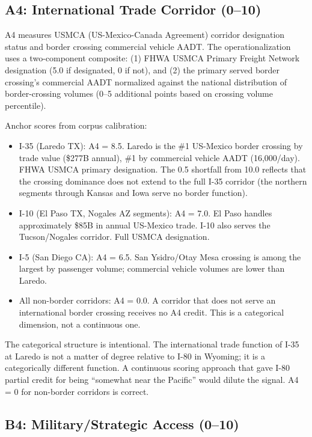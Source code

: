 \subsection{A4: International Trade Corridor (0--10)}

A4 measures USMCA (US-Mexico-Canada Agreement) corridor designation status and border crossing commercial vehicle AADT. The operationalization uses a two-component composite: (1) FHWA USMCA Primary Freight Network designation (5.0 if designated, 0 if not), and (2) the primary served border crossing's commercial AADT normalized against the national distribution of border-crossing volumes (0--5 additional points based on crossing volume percentile).

Anchor scores from corpus calibration:

\begin{itemize}
  \item I-35 (Laredo TX): A4 = 8.5. Laredo is the \#1 US-Mexico border crossing by trade value (\$277B annual), \#1 by commercial vehicle AADT (16,000/day). FHWA USMCA primary designation. The 0.5 shortfall from 10.0 reflects that the crossing dominance does not extend to the full I-35 corridor (the northern segments through Kansas and Iowa serve no border function).
  \item I-10 (El Paso TX, Nogales AZ segments): A4 = 7.0. El Paso handles approximately \$85B in annual US-Mexico trade. I-10 also serves the Tucson/Nogales corridor. Full USMCA designation.
  \item I-5 (San Diego CA): A4 = 6.5. San Ysidro/Otay Mesa crossing is among the largest by passenger volume; commercial vehicle volumes are lower than Laredo.
  \item All non-border corridors: A4 = 0.0. A corridor that does not serve an international border crossing receives no A4 credit. This is a categorical dimension, not a continuous one.
\end{itemize}

The categorical structure is intentional. The international trade function of I-35 at Laredo is not a matter of degree relative to I-80 in Wyoming; it is a categorically different function. A continuous scoring approach that gave I-80 partial credit for being ``somewhat near the Pacific'' would dilute the signal. A4 = 0 for non-border corridors is correct.

\subsection{B4: Military/Strategic Access (0--10)}

